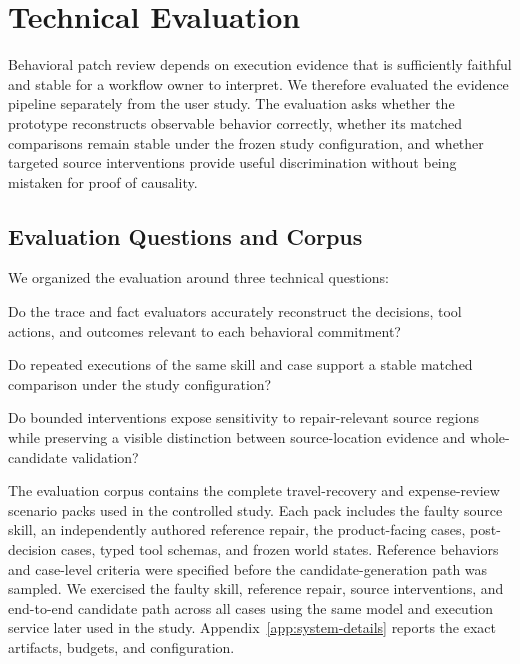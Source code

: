 \section{Technical Evaluation}
\label{sec:technical-evaluation}

Behavioral patch review depends on execution evidence that is sufficiently
faithful and stable for a workflow owner to interpret. We therefore evaluated
the evidence pipeline separately from the user study. The evaluation asks
whether the prototype reconstructs observable behavior correctly, whether its
matched comparisons remain stable under the frozen study configuration, and
whether targeted source interventions provide useful discrimination without
being mistaken for proof of causality.

\subsection{Evaluation Questions and Corpus}

We organized the evaluation around three technical questions:

\begin{description}[leftmargin=0pt,labelindent=0pt,style=nextline]
    \item[\textbf{TQ1: Evidence fidelity.}] Do the trace and fact evaluators
    accurately reconstruct the decisions, tool actions, and outcomes relevant
    to each behavioral commitment?
    \item[\textbf{TQ2: Execution stability.}] Do repeated executions of the
    same skill and case support a stable matched comparison under the study
    configuration?
    \item[\textbf{TQ3: Intervention discriminability.}] Do bounded
    interventions expose sensitivity to repair-relevant source regions while
    preserving a visible distinction between source-location evidence and
    whole-candidate validation?
\end{description}

The evaluation corpus contains the complete travel-recovery and
expense-review scenario packs used in the controlled study. Each pack includes
the faulty source skill, an independently authored reference repair, the
product-facing cases, post-decision cases, typed tool schemas, and frozen world
states. Reference behaviors and case-level criteria were specified before the
candidate-generation path was sampled. We exercised the faulty skill,
reference repair, source interventions, and end-to-end candidate path across
all cases using the same model and execution service later used in the study.
Appendix~\ref{app:system-details} reports the exact artifacts, budgets, and
configuration.

